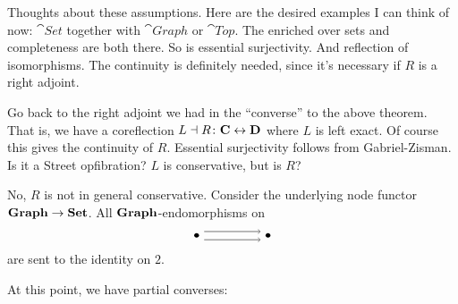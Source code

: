Thoughts about these assumptions. Here are the desired examples I can think of now: $ \cat{Set} $ together with $ \cat{Graph} $ or $ \cat{Top} $. The enriched over sets and completeness are both there. So is essential surjectivity. And reflection of isomorphisms.  The continuity is definitely needed, since it's necessary if $ R $ is a right adjoint. 

Go back to the right adjoint we had in the ``converse'' to the above theorem.  That is, we have a coreflection $ L \dashv R \colon \mathbf{C} \leftrightarrow \mathbf{D} $ where $ L $ is left exact.  Of course this gives the continuity of $ R $. Essential surjectivity follows from Gabriel-Zisman. Is it a Street opfibration? $ L $ is conservative, but is $ R $?

\begin{ex}
	No, $ R $ is not in general conservative.  Consider the underlying node functor $ \mathbf{Graph} \to \mathbf{Set} $.  All $ \mathbf{Graph} $-endomorphisms on
	\[
	\begin{tikzpicture}
		\node (a) at (0,0) {$ \bullet $};
		\node (b) at (2,0) {$ \bullet $};
		\draw [->] (a.30) to (b.150);
		\draw [->] (a.-30) to (b.-150);
	\end{tikzpicture}
	\]
	are sent to the identity on $ 2 $.
\end{ex}

At this point, we have partial converses:

\hfill
{}





































